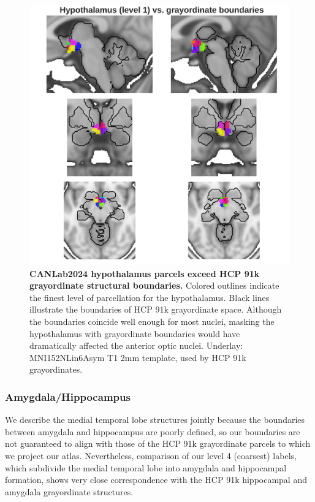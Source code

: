 \documentclass[10pt,letterpaper]{article}
\begin{document}
\begin{figure}[t!]
\centering
\includegraphics[width=\linewidth]{images/hypothal_vs_cifti.png}
\caption{
{\bf
CANLab2024 hypothalamus parcels exceed HCP 91k grayordinate structural boundaries.} 
Colored outlines indicate the finest level of parcellation for the hypothalamus. Black lines illustrate the boundaries of HCP 91k grayordinate space. Although the boundaries coincide well enough for most nuclei, masking the hypothalamus with grayordinate boundaries would have dramatically affected the anterior optic nuclei. Underlay: MNI152NLin6Asym T1 2mm template, used by HCP 91k grayordinates.}
\label{hypothal-vs-cifti-figure}
\end{figure}

\subsubsection{Amygdala/Hippocampus}
We describe the medial temporal lobe structures jointly because the boundaries between amygdala and hippocampus are poorly defined, so our boundaries are not guaranteed to align with those of the HCP 91k grayordinate parcels to which we project our atlas. Nevertheless, comparison of our level 4 (coarsest) labels, which subdivide the medial temporal lobe into amygdala and hippocampal formation, shows very close correspondence with the HCP 91k hippocampal and amygdala grayordinate structures.
\end{document}
